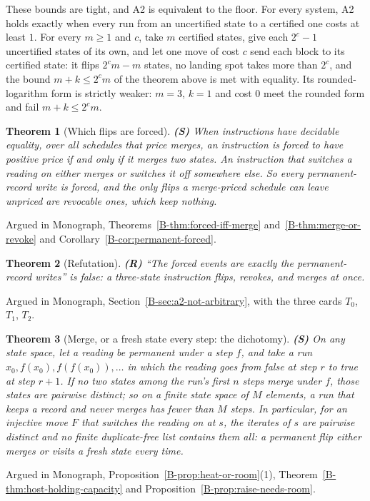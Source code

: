 \documentclass[11pt, a4paper]{report}
\theoremstyle{definition}
\theoremstyle{plain}
\newtheorem{theorem}{Theorem}[chapter]
\begin{document}
These bounds are tight, and A2 is equivalent to the floor. For every system, A2 holds exactly when every run from an uncertified state to a certified one costs at least $1$. For every $m \ge 1$ and $c$, take $m$ certified states, give each $2^c - 1$ uncertified states of its own, and let one move of cost $c$ send each block to its certified state: it flips $2^c m - m$ states, no landing spot takes more than $2^c$, and the bound $m + k \le 2^c m$ of the theorem above is met with equality. Its rounded-logarithm form is strictly weaker: $m = 3$, $k = 1$ and cost $0$ meet the rounded form and fail $m + k \le 2^c m$.

\begin{theorem}[Which flips are forced] \textbf{(S)}
When instructions have decidable equality, over all schedules that price merges, an instruction is forced to have positive price if and only if it merges two states. An instruction that switches a reading on either merges or switches it off somewhere else. So every permanent-record write is forced, and the only flips a merge-priced schedule can leave unpriced are revocable ones, which keep nothing.
\end{theorem}
\noindent Argued in Monograph, Theorems~\ref{B-thm:forced-iff-merge} and~\ref{B-thm:merge-or-revoke}
and Corollary~\ref{B-cor:permanent-forced}.

\begin{theorem}[Refutation] \textbf{(R)}
``The forced events are exactly the permanent-record writes'' is false: a three-state instruction flips, revokes, and merges at once.
\end{theorem}
\noindent Argued in Monograph, Section~\ref{B-sec:a2-not-arbitrary}, with the three cards $T_0$, $T_1$, $T_2$.

\begin{theorem}[Merge, or a fresh state every step: the dichotomy] \textbf{(S)}
On any state space, let a reading be permanent under a step $f$, and take a run $x_0, f(x_0), f(f(x_0)), \ldots$ in which the reading goes from false at step $r$ to true at step $r + 1$. If no two states among the run's first $n$ steps merge under $f$, those states are pairwise distinct; so on a finite state space of $M$ elements, a run that keeps a record and never merges has fewer than $M$ steps. In particular, for an injective move $F$ that switches the reading on at $s$, the iterates of $s$ are pairwise distinct and no finite duplicate-free list contains them all: a permanent flip either merges or visits a fresh state every time.
\end{theorem}
\noindent Argued in Monograph, Proposition~\ref{B-prop:heat-or-room}(1), Theorem~\ref{B-thm:host-holding-capacity} and Proposition~\ref{B-prop:raise-needs-room}.
\end{document}
